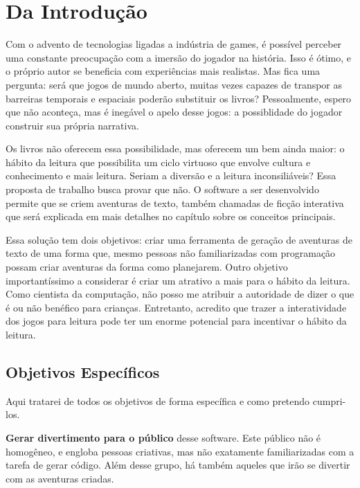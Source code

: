 \chapter{Da Introdução}
\label{cap:introducao}

Com o advento de tecnologias  ligadas a indústria de games, é possível perceber
uma constante preocupação com a imersão do jogador na história. Isso é ótimo, e
o próprio autor se beneficia com experiências mais realistas. Mas fica uma
pergunta: será que jogos de mundo aberto, muitas vezes capazes de transpor as
barreiras temporais e espaciais poderão substituir os livros? Pessoalmente,
espero que não aconteça, mas é inegável o apelo desse jogos: a possiblidade do
jogador construir sua própria narrativa.

Os livros não oferecem essa possibilidade, mas oferecem um bem ainda maior: o
hábito da leitura que possibilita um ciclo virtuoso que envolve cultura e
conhecimento e mais leitura. Seriam a diversão e a leitura inconsiliáveis? Essa
proposta de trabalho busca provar que não. O software a ser desenvolvido permite
que se criem aventuras de texto, também chamadas de ficção interativa que será
explicada em mais detalhes no capítulo sobre os conceitos principais.

Essa solução tem dois objetivos: criar uma ferramenta de geração de aventuras de
texto de uma forma que, mesmo pessoas não familiarizadas com programação possam
criar aventuras da forma como planejarem. Outro objetivo importantíssimo a
considerar é criar um atrativo a mais para o hábito da leitura. Como cientista
da computação, não posso me atribuir a autoridade de dizer o que é ou não
benéfico para crianças. Entretanto, acredito que trazer a interatividade dos
jogos para leitura pode ter um enorme potencial para incentivar o hábito da
leitura.

\section{Objetivos Específicos}
\label{sec:goals}

Aqui tratarei de todos os objetivos de forma específica e como pretendo
cumpri-los.

\textbf{Gerar divertimento para o público} desse software. Este público não é
homogêneo, e engloba pessoas criativas, mas não exatamente familiarizadas com a
tarefa de gerar código. Além desse grupo, há também aqueles que irão se divertir
com as aventuras criadas.

